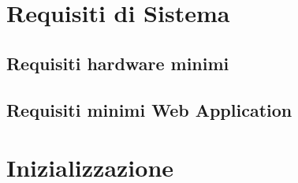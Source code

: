 \section{Requisiti di Sistema}
\subsection{Requisiti hardware minimi}
\subsection{Requisiti minimi Web Application}

\section{Inizializzazione}